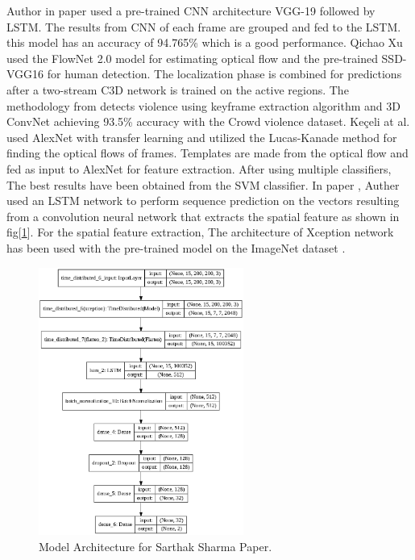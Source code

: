 \documentclass[runningheads]{llncs}
\begin{document}
Author in paper \cite{abdali2019robust} used a pre-trained CNN architecture VGG-19 \cite{simonyan2014very} followed by LSTM. The results from CNN of each frame are grouped and fed to the LSTM. this model has an accuracy of 94.765\% which is a good performance.  Qichao Xu \cite{xu2019localization} used the FlowNet 2.0 \cite{ilg2017flownet} model for estimating optical flow and the pre-trained SSD-VGG16 for human detection. The localization phase is combined for predictions after a two-stream C3D network \cite{tran2015learning} is trained on the active regions. The methodology from \cite{song2019novel} detects violence using keyframe extraction algorithm and 3D ConvNet achieving 93.5\% accuracy with the Crowd violence dataset. Keçeli at al. \cite{kecceli2017violent} used AlexNet with transfer learning and utilized the Lucas-Kanade method for finding the optical flows of frames. Templates are made from the optical flow and fed as input to AlexNet for feature extraction. After using multiple classifiers, The best results have been obtained from the SVM classifier. In paper \cite{sharma2021fully}, Auther used an LSTM network to perform sequence prediction on the vectors resulting from a convolution neural network that extracts the spatial feature as shown in fig[\ref{violenceSharmaCnn}]. For the spatial feature extraction, The architecture of Xception \cite{chollet2017xception} network has been used with the pre-trained model on the ImageNet dataset \cite{krizhevsky2012imagenet}.

\begin{figure}
\centering
\includegraphics[width=0.6\textwidth]{figures/violenceSharmaCnn.png}
\caption{Model Architecture for Sarthak Sharma Paper.} \label{violenceSharmaCnn}
\end{figure}
\end{document}
